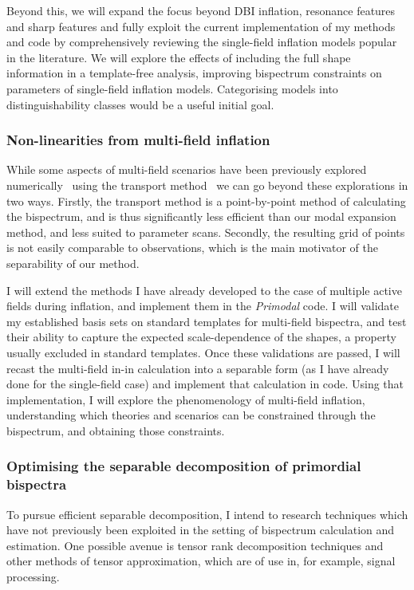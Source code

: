 Beyond this,
we will expand the focus beyond DBI inflation, resonance features and sharp features
and fully exploit the current implementation of my methods and code
by comprehensively reviewing the single-field inflation models popular in the literature.
We will explore the effects of including the full shape information in a template-free analysis,
improving bispectrum constraints on parameters of single-field inflation models.
Categorising models into distinguishability classes would be a useful initial goal.

\subsubsection{Non-linearities from multi-field inflation}
While some aspects of multi-field scenarios have been previously explored
numerically~\cite{Fumagalli_2019} using the transport method~\cite{transport_pytransport_2}
we can go beyond these explorations in two ways. Firstly, the transport method is a
point-by-point method of calculating the bispectrum, and is thus significantly
less efficient than our modal expansion method, and less suited to parameter scans.
Secondly, the resulting grid of points is not easily comparable to observations,
which is the main motivator of the separability of our method.

I will extend the methods I have already developed to the case of multiple active fields during inflation, and implement them in the \textit{Primodal} code.
I will validate my established basis sets on standard templates for multi-field bispectra,
and test their ability to capture the expected scale-dependence of the shapes,
a property usually excluded in standard templates.
Once these validations are passed, I will recast the multi-field in-in calculation
into a separable form (as I have already done for the single-field case)
and implement that calculation in code. Using that implementation,
I will explore the phenomenology of multi-field inflation,
understanding which theories and scenarios can be constrained through the bispectrum, and obtaining those constraints.

\subsubsection{Optimising the separable decomposition of primordial bispectra}
To pursue efficient separable decomposition, I intend to research techniques which have not
previously been exploited in the setting of bispectrum calculation and estimation.
One possible avenue is tensor rank decomposition techniques and other methods of tensor approximation,
which are of use in, for example, signal processing.

